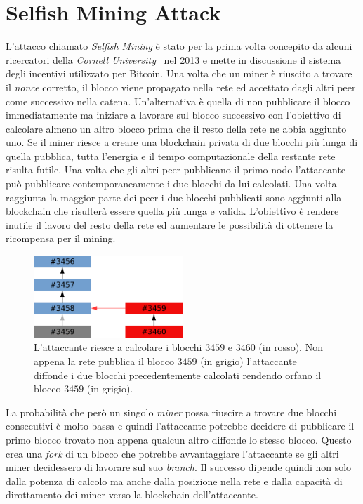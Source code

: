 \section{Selfish Mining Attack}
L'attacco chiamato \textit{Selfish Mining} è stato per la prima volta concepito da alcuni ricercatori della \textit{Cornell University}~\cite{selfish} nel 2013 e mette in discussione il sistema degli incentivi utilizzato per Bitcoin.\newline
Una volta che un miner è riuscito a trovare il \textit{nonce} corretto, il blocco viene propagato nella rete ed accettato dagli altri peer come successivo nella catena.\newline
Un'alternativa è quella di non pubblicare il blocco immediatamente ma iniziare a lavorare sul blocco successivo con l'obiettivo di calcolare almeno un altro blocco prima che il resto della rete ne abbia aggiunto uno. Se il miner riesce a creare una blockchain privata di due blocchi più lunga di quella pubblica, tutta l'energia e il tempo computazionale della restante rete risulta futile. Una volta che gli altri peer pubblicano il primo nodo l'attaccante può pubblicare contemporaneamente i due blocchi da lui calcolati. Una volta raggiunta la maggior parte dei peer i due blocchi pubblicati sono aggiunti alla blockchain che risulterà essere quella più lunga e valida. L'obiettivo è rendere inutile il lavoro del resto della rete ed aumentare le possibilità di ottenere la ricompensa per il mining.
\begin{figure}[H]
    \centering
    \includegraphics[width=0.5\textwidth]{images/selfish.png}
    \caption{L'attaccante riesce a calcolare i blocchi $3459$ e $3460$ (in rosso). Non appena la rete pubblica il blocco $3459$ (in grigio) l'attaccante diffonde i due blocchi precedentemente calcolati rendendo orfano il blocco $3459$ (in grigio).}
\end{figure}
La probabilità che però un singolo \textit{miner} possa riuscire a trovare due blocchi consecutivi è molto bassa e quindi l'attaccante potrebbe decidere di pubblicare il primo blocco trovato non appena qualcun altro diffonde lo stesso blocco. Questo crea una \textit{fork} di un blocco che potrebbe avvantaggiare l'attaccante se gli altri miner decidessero di lavorare sul suo \textit{branch}. Il successo dipende quindi non solo dalla potenza di calcolo ma anche dalla posizione nella rete e dalla capacità di dirottamento dei miner verso la blockchain dell'attaccante.\newline
